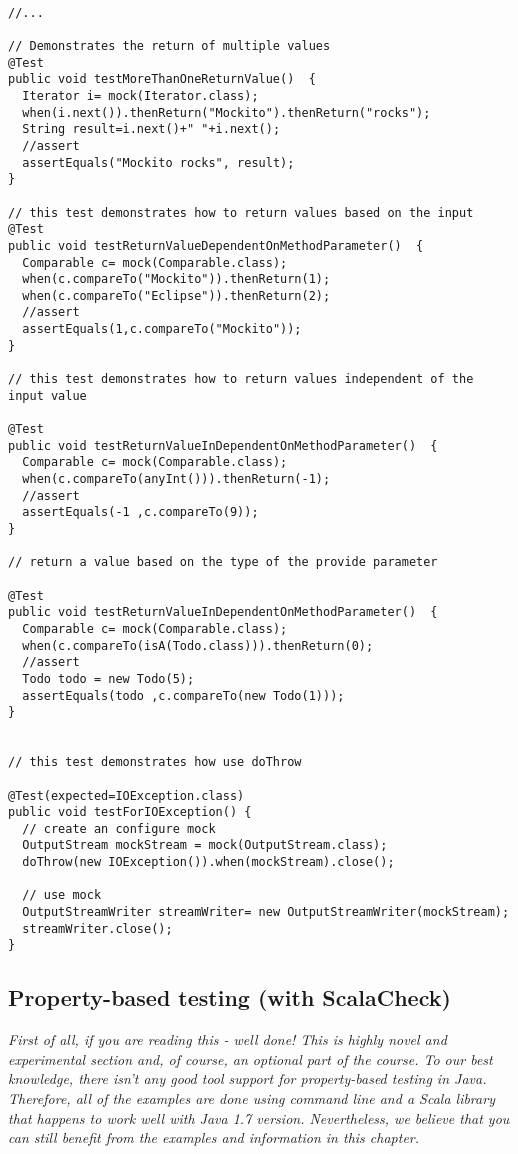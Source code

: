 \documentclass{article}
\begin{document}
\begin{lstlisting}

//...

// Demonstrates the return of multiple values
@Test
public void testMoreThanOneReturnValue()  {
  Iterator i= mock(Iterator.class);
  when(i.next()).thenReturn("Mockito").thenReturn("rocks");
  String result=i.next()+" "+i.next();
  //assert
  assertEquals("Mockito rocks", result);
}

// this test demonstrates how to return values based on the input
@Test
public void testReturnValueDependentOnMethodParameter()  {
  Comparable c= mock(Comparable.class);
  when(c.compareTo("Mockito")).thenReturn(1);
  when(c.compareTo("Eclipse")).thenReturn(2);
  //assert
  assertEquals(1,c.compareTo("Mockito"));
}

// this test demonstrates how to return values independent of the input value

@Test
public void testReturnValueInDependentOnMethodParameter()  {
  Comparable c= mock(Comparable.class);
  when(c.compareTo(anyInt())).thenReturn(-1);
  //assert
  assertEquals(-1 ,c.compareTo(9));
}

// return a value based on the type of the provide parameter

@Test
public void testReturnValueInDependentOnMethodParameter()  {
  Comparable c= mock(Comparable.class);
  when(c.compareTo(isA(Todo.class))).thenReturn(0);
  //assert
  Todo todo = new Todo(5);
  assertEquals(todo ,c.compareTo(new Todo(1)));
} 


// this test demonstrates how use doThrow

@Test(expected=IOException.class)
public void testForIOException() {
  // create an configure mock
  OutputStream mockStream = mock(OutputStream.class);
  doThrow(new IOException()).when(mockStream).close();
  
  // use mock
  OutputStreamWriter streamWriter= new OutputStreamWriter(mockStream);
  streamWriter.close();
} 

\end{lstlisting}

\subsection{Property-based testing (with ScalaCheck)}

\textit{First of all, if you are reading this - well done! This is
  highly novel and experimental section and, of course, an optional
  part of the course. To our best knowledge, there
  isn't any good tool support for property-based testing in
  Java. Therefore, all of the examples are done using command line and
  a Scala library that happens to work well with Java 1.7 version.
  Nevertheless, we believe that you can still benefit from the
  examples and information in this chapter.}\\
\end{document}
